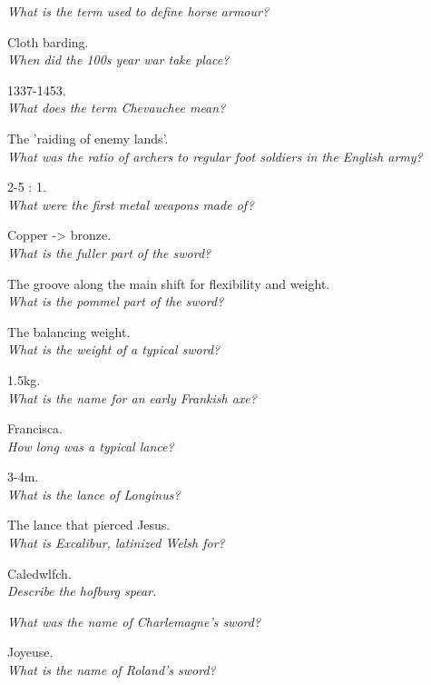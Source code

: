 \documentclass[12pt]{article}
\begin{document}
\textit{What is the term used to define horse armour?}

Cloth barding.\\

\textit{When did the 100s year war take place?}

1337-1453.\\

\textit{What does the term Chevauchee mean?}

The 'raiding of enemy lands'.\\

\textit{What was the ratio of archers to regular foot soldiers in the English army?}

2-5 : 1.\\
\textit{What were the first metal weapons made of?}

Copper -> bronze.\\

\textit{What is the fuller part of the sword?}

The groove along the main shift for flexibility and weight.\\

\textit{What is the pommel part of the sword?}

The balancing weight.\\

\textit{What is the weight of a typical sword?}

1.5kg.\\

\textit{What is the name for an early Frankish axe?}

Francisca.\\

\textit{How long was a typical lance?}

3-4m.\\

\textit{What is the lance of Longinus?}

The lance that pierced Jesus.\\

\textit{What is Excalibur, latinized Welsh for?}

Caledwlfch.\\

\textit{Describe the hofburg spear.}

\textit{What was the name of Charlemagne's sword?}

Joyeuse.\\

\textit{What is the name of Roland's sword?}
\end{document}

